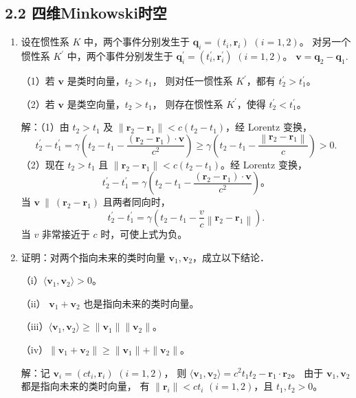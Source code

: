 \subsection{2.2 四维Minkowski时空}
\begin{enumerate}
    \item 设在惯性系 $K$ 中，两个事件分别发生于 $\boldsymbol{q}_i=(t_i, \boldsymbol{r}_i)$ $(i=1,2)$。
    对另一个惯性系 $K^{\prime}$ 中，两个事件分别发生于 $\boldsymbol{q}_i^{\prime}=(t_i^{\prime}, \boldsymbol{r}_i^{\prime})$ $(i=1,2)$。
    $\boldsymbol{v}=\boldsymbol{q}_2-\boldsymbol{q}_1$.
    
    （1）若 $\boldsymbol{v}$ 是类时向量，$t_2>t_1$，
    则对任一惯性系 $K^{\prime}$，都有 $t_2^{\prime}>t_1^{\prime}$。
    
    （2）若 $\boldsymbol{v}$ 是类空向量，$t_2>t_1$，
    则存在惯性系 $K^{\prime}$，使得 $t_2^{\prime}<t_1^{\prime}$。

解：（1）由 $t_{2}>t_{1}$ 及 $\|\boldsymbol{r}_{2}-\boldsymbol{r}_{1}\|<c(t_{2}-t_{1})$，经 Lorentz 变换，
$$t_{2}^{\prime}-t_{1}^{\prime}=\gamma\left(t_{2}-t_{1}-\frac{\left(\boldsymbol{r}_{2}-\boldsymbol{r}_{1}\right) \cdot \boldsymbol{v}}{c^{2}}\right) 
\geqslant \gamma\left(t_{2}-t_{1}-\frac{\left\|\boldsymbol{r}_{2}-\boldsymbol{r}_{1}\right\|}{c}\right)>0.$$
（2）现在 $t_{2}>t_{1}$ 且 $\|\boldsymbol{r}_{2}-\boldsymbol{r}_{1}\|<c(t_{2}-t_{1})$。经 Lorentz 变换，
$$t_{2}^{\prime}-t_{1}^{\prime}=\gamma\left(t_{2}-t_{1}-\frac{\left(\boldsymbol{r}_{2}-\boldsymbol{r}_{1}\right) \cdot \boldsymbol{v}}{c^{2}}\right)。$$
当 $\boldsymbol{v}\ \|\ (\boldsymbol{r}_{2}-\boldsymbol{r}_{1})$ 且两者同向时，
$$t_{2}^{\prime}-t_{1}^{\prime}=\gamma\left(t_{2}-t_{1}-\frac{v}{c}\left\|\boldsymbol{r}_{2}-\boldsymbol{r}_{1}\right\|\right).$$
当 $v$ 非常接近于 $c$ 时，可使上式为负。
    
    \item 证明：对两个指向未来的类时向量 $\boldsymbol{v}_1, \boldsymbol{v}_2$，成立以下结论．
    
    （i）$\langle\boldsymbol{v}_1, \boldsymbol{v}_2\rangle>0$。
    
    （ii） $\boldsymbol{v}_1+\boldsymbol{v}_2$ 也是指向未来的类时向量。
    
    （iii）$\langle\boldsymbol{v}_1, \boldsymbol{v}_2\rangle 
    \geqslant\|\boldsymbol{v}_1\|\|\boldsymbol{v}_2\|$。
    
    （iv）$\|\boldsymbol{v}_1+\boldsymbol{v}_2\| 
    \geqslant\|\boldsymbol{v}_1\|+\|\boldsymbol{v}_2\|$。

解：记 $\boldsymbol{v}_{i}=(ct_{i}, \boldsymbol{r}_{i})$ $(i=1,2)$，
则 $\langle\boldsymbol{v}_{1}, \boldsymbol{v}_{2}\rangle=c^{2}t_{1}t_{2}-\boldsymbol{r}_{1} \cdot \boldsymbol{r}_{2}$。
由于 $\boldsymbol{v}_{1}, \boldsymbol{v}_{2}$都是指向未来的类时向量，
有 $\|\boldsymbol{r}_{i}\|<ct_{i}$ $(i=1,2)$，且 $t_{1}, t_{2}>0$。


\end{enumerate}
